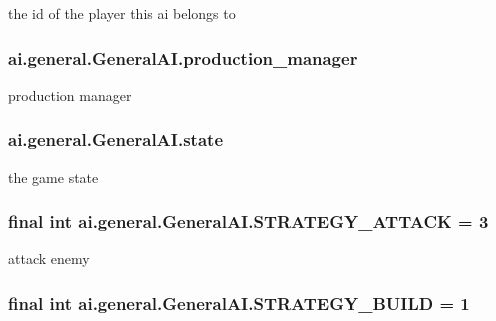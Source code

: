 \label{classai_1_1general_1_1_general_a_i_a232c46c472f72f48ddc64152b6245ef1}
the id of the player this ai belongs to \hypertarget{classai_1_1general_1_1_general_a_i_a36b95e1d1adbc36d26390f8da11bfe35}{
\subsubsection[{production\_\-manager}]{ {\bf ai.general.GeneralAI.production\_\-manager}}}
\label{classai_1_1general_1_1_general_a_i_a36b95e1d1adbc36d26390f8da11bfe35}
production manager \hypertarget{classai_1_1general_1_1_general_a_i_a3f311af8e06d47cb8b104d3ff4244484}{
\subsubsection[{state}]{ {\bf ai.general.GeneralAI.state}}}
\label{classai_1_1general_1_1_general_a_i_a3f311af8e06d47cb8b104d3ff4244484}
the game state \hypertarget{classai_1_1general_1_1_general_a_i_ae783c4d7aa11aed961f99e1202e49ca1}{
\subsubsection[{STRATEGY\_\-ATTACK}]{\setlength{\rightskip}{0pt plus 5cm}final int {\bf ai.general.GeneralAI.STRATEGY\_\-ATTACK} = 3}}
\label{classai_1_1general_1_1_general_a_i_ae783c4d7aa11aed961f99e1202e49ca1}
attack enemy \hypertarget{classai_1_1general_1_1_general_a_i_ac8bca2198328c720d0f098f86c7f994c}{
\subsubsection[{STRATEGY\_\-BUILD}]{\setlength{\rightskip}{0pt plus 5cm}final int {\bf ai.general.GeneralAI.STRATEGY\_\-BUILD} = 1}}

